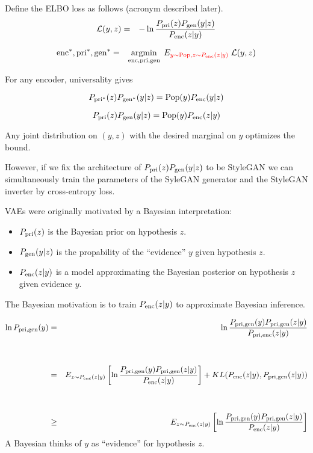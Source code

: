 {Define the ELBO loss as follows (acronym described later).
\begin{eqnarray*}
{\cal L}(y,z) & = & - \ln \frac{P_{\mathrm{pri}}(z)P_{\mathrm{gen}}(y|z)}{P_{\mathrm{enc}}(z|y)}
\end{eqnarray*}

\begin{eqnarray*}
\mathrm{enc}^*,\mathrm{pri}^*,\mathrm{gen}^* & = & \operatorname*{argmin}_{\mathrm{enc},\mathrm{pri},\mathrm{gen}}\;E_{\color{red} y \sim \mathrm{Pop},z\sim P_{\mathrm{enc}}(z|y)}\;{\cal L}(y,z)
\end{eqnarray*}

\vfill
For any encoder, universality gives

{\color{red} $$P_{\mathrm{pri}^*}(z)P_{\mathrm{gen}^*}(y|z) = \mathrm{Pop}(y)P_{\mathrm{enc}}(y|z)$$}


{\color{red} $$P_{\mathrm{pri}}(z)P_{\mathrm{gen}}(y|z) = \mathrm{Pop}(y)P_{\mathrm{enc}}(z|y)$$}

\vfill
Any joint distribution on $(y,z)$ with the desired marginal on $y$ optimizes the bound.

\vfill
However, if we fix the architecture of $P_{\mathrm{pri}}(z)P_{\mathrm{gen}}(y|z)$ to be StyleGAN we can simultaneously train the parameters of the SyleGAN generator
and the StyleGAN inverter by cross-entropy loss.


VAEs were originally motivated by a Bayesian interpretation:

\vfill
\begin{itemize}
\item $P_{\mathrm{pri}}(z)$ is the Bayesian prior on hypothesis $z$.

\vfill
\item $P_{\mathrm{gen}}(y|z)$ is the propability of the ``evidence'' $y$ given hypothesis $z$.

\vfill
\item $P_{\mathrm{enc}}(z|y)$ is a model approximating the Bayesian posterior on hypothesis $z$ given evidence $y$.
\end{itemize}

\vfill
The Bayesian motivation is to train $P_{\mathrm{enc}}(z|y)$ to approximate Bayesian inference.

{\huge
\begin{eqnarray*}
\ln P_{\mathrm{pri},\mathrm{gen}}(y) & =  & \ln \frac{P_{\mathrm{pri},\mathrm{gen}}(y)P_{\mathrm{pri},\mathrm{gen}}(z|y)}{P_{\mathrm{pri},\mathrm{enc}}(z|y)} \\
\\
\\
& = & E_{z \sim P_{\mathrm{enc}}(z|y)}\left[\ln \frac{P_{\mathrm{pri},\mathrm{gen}}(y)P_{\mathrm{pri},\mathrm{gen}}(z|y)}{P_{\mathrm{enc}}(z|y)}\right] + KL(P_{\mathrm{enc}}(z|y),P_{\mathrm{pri},\mathrm{gen}}(z|y)) \\
\\
\\
& \geq & E_{z \sim P_{\mathrm{enc}}(z|y)}\left[\ln \frac{P_{\mathrm{pri},\mathrm{gen}}(y)P_{\mathrm{pri},\mathrm{gen}}(z|y)}{P_{\mathrm{enc}}(z|y)}\right] \\
\end{eqnarray*}
}
A Bayesian thinks of $y$ as ``evidence'' for hypothesis $z$.

}
